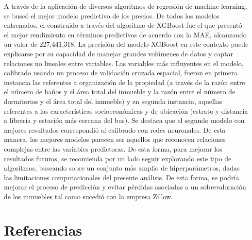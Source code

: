 \documentclass[a4paper]{article}
\theoremstyle{remark}
\theoremstyle{definition}
\begin{document}
A través de la aplicación de diversos algoritmos de regresión de machine learning, se buscó el mejor modelo predictivo de los precios. De todos los modelos entrenados, el construido a través del algoritmo de XGBoost fue el que presentó el mejor rendimiento en términos predictivos de acuerdo con la MAE, alcanzando un valor de 227,441,318. La precisión del modelo XGBoost en este contexto puede explicarse por su capacidad de manejar grandes volúmenes de datos y captar relaciones no lineales entre variables. Las variables más influyentes en el modelo, calibrado usando un proceso de validación cruzada espacial, fueron en primera instancia las referentes a organización de la propiedad (a través de la razón entre el número de baños y el área total del inmueble y la razón entre el número de dormitorios y el área total del inmueble) y en segunda instancia, aquellas referentes a las características socioeconómicas y de ubicación (estrato y distancia a librería y estación más cercana del bus).  Se destaca que el segundo modelo con mejores resultados correspondió al calibrado con redes neuronales. De esta manera, los mejores modelos parecen ser aquellos que reconocen relaciones complejas entre las variables predictoras. De esta forma, para mejorar los resultados futuros, se recomienda por un lado seguir explorando este tipo de algoritmos, buscando sobre un conjunto más amplio de hiperparámetros, dadas las limitaciones computacionales del presente análisis. De esta forma, se podría mejorar el proceso de predicción y evitar pérdidas asociadas a un sobrevaloración de los inmuebles tal como sucedió con la empresa Zillow. 


\section{Referencias}
\end{document}
